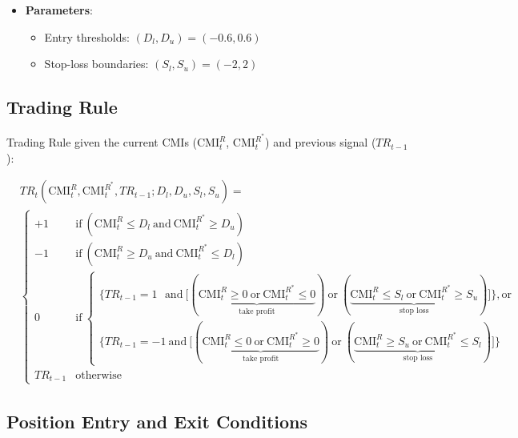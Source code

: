 \documentclass[
  letterpaper,
  DIV=11,
  numbers=noendperiod]{scrartcl}
\providecommand{\tightlist}{%
  \setlength{\itemsep}{0pt}\setlength{\parskip}{0pt}}\usepackage{longtable,booktabs,array}
\begin{document}
\begin{itemize}
\tightlist
\item
  \textbf{Parameters}:

  \begin{itemize}
  \tightlist
  \item
    Entry thresholds: \((D_l, D_u) = (-0.6, 0.6)\)
  \item
    Stop-loss boundaries: \((S_l, S_u) = (-2, 2)\)
  \end{itemize}
\end{itemize}

\subsection{Trading Rule}\label{trading-rule}

Trading Rule given the current CMIs (\(\mathrm{CMI}_t^R\),
\(\mathrm{CMI}_t^{R^*}\)) and previous signal (\(TR_{t-1}\)):

\begin{align*}
&TR_t(\text{CMI}_t^R, \text{CMI}_t^{R^*}, TR_{t-1}; D_l, D_u, S_l, S_u) 
=
\\[0.2em]\nonumber
&\begin{cases}
+1 & \text{if} ~  
(\text{CMI}_t^R \leq  D_l 
~\text{and}~ 
\text{CMI}_t^{R^*} \geq D_u)
\\
-1 & \text{if} ~ 
(\text{CMI}_t^R \geq D_u 
~\text{and}~ 
\text{CMI}_t^{R^*} \leq D_l)
\\
0 & \text{if}~
\begin{cases}
\biggl\{
TR_{t-1}=1 
~~~\text{and}~ 
\bigl[
(\underbrace{\text{CMI}_t^R\geq 0 ~\text{or}~ \text{CMI}_t^{R^*}\leq 0}_{\text{take profit}})
~\text{or}~
(\underbrace{\text{CMI}_t^R\leq S_l ~\text{or}~ \text{CMI}_t^{R^*}\geq S_u}_{\text{stop loss}})
\bigr]
\biggr\}
,\text{or}
\\
\biggl\{
TR_{t-1}=-1 
~\text{and}~ 
\bigl[
(\underbrace{\text{CMI}_t^R\leq 0 ~\text{or}~ \text{CMI}_t^{R^*}\geq 0}_{\text{take profit}})
~\text{or}~
(\underbrace{\text{CMI}_t^R\geq S_u ~\text{or}~ \text{CMI}_t^{R^*}\leq S_l}_{\text{stop loss}})
\bigr]
\biggr\}
\end{cases}
\\
TR_{t-1} & \text{otherwise}
\end{cases}
\end{align*}

\subsection{Position Entry and Exit
Conditions}\label{position-entry-and-exit-conditions}
\end{document}
